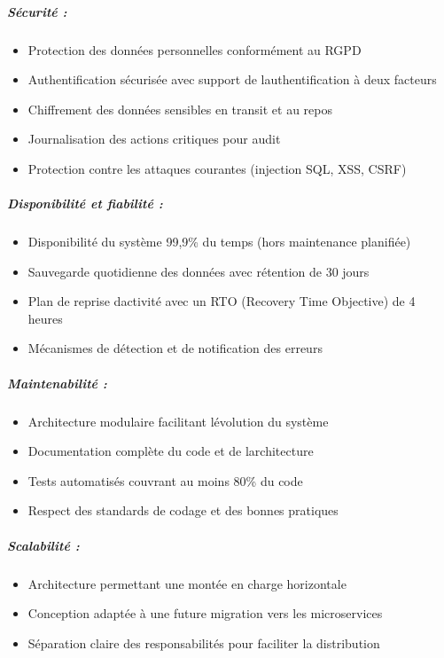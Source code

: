 \documentclass[12pt,a4paper,twoside]{report}
\begin{document}
\hypertarget{suxe9curituxe9}{%
\subparagraph{Sécurité :}\label{suxe9curituxe9}}

\begin{itemize}
\item
  Protection des données personnelles conformément au RGPD
\item
  Authentification sécurisée avec support de
  l\textquotesingle authentification à deux facteurs
\item
  Chiffrement des données sensibles en transit et au repos
\item
  Journalisation des actions critiques pour audit
\item
  Protection contre les attaques courantes (injection SQL, XSS, CSRF)
\end{itemize}

\hypertarget{disponibilituxe9-et-fiabilituxe9}{%
\subparagraph{Disponibilité et fiabilité
:}\label{disponibilituxe9-et-fiabilituxe9}}

\begin{itemize}
\item
  Disponibilité du système 99,9\% du temps (hors maintenance planifiée)
\item
  Sauvegarde quotidienne des données avec rétention de 30 jours
\item
  Plan de reprise d\textquotesingle activité avec un RTO (Recovery Time
  Objective) de 4 heures
\item
  Mécanismes de détection et de notification des erreurs
\end{itemize}

\hypertarget{maintenabilituxe9}{%
\subparagraph{Maintenabilité :}\label{maintenabilituxe9}}

\begin{itemize}
\item
  Architecture modulaire facilitant l\textquotesingle évolution du
  système
\item
  Documentation complète du code et de l\textquotesingle architecture
\item
  Tests automatisés couvrant au moins 80\% du code
\item
  Respect des standards de codage et des bonnes pratiques
\end{itemize}

\hypertarget{scalabilituxe9}{%
\subparagraph{Scalabilité :}\label{scalabilituxe9}}

\begin{itemize}
\item
  Architecture permettant une montée en charge horizontale
\item
  Conception adaptée à une future migration vers les microservices
\item
  Séparation claire des responsabilités pour faciliter la distribution
\end{itemize}
\end{document}
